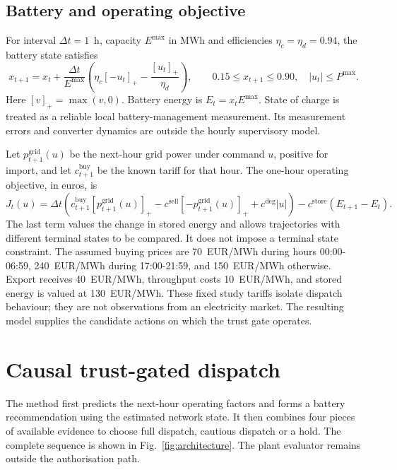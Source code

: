 \documentclass[11pt,a4paper]{article}
\newcommand{\pos}[1]{[#1]_{+}}
\begin{document}
\subsection{Battery and operating objective}
For interval $\Delta t=1$~h, capacity $E^{\max}$ in MWh and efficiencies $\eta_c=\eta_d=0.94$, the battery state satisfies
\begin{equation}
x_{t+1}=x_t+\frac{\Delta t}{E^{\max}}\left(\eta_c\pos{-u_t}-\frac{\pos{u_t}}{\eta_d}\right),\qquad
0.15\leq x_{t+1}\leq0.90,\quad |u_t|\leq P^{\max}.
\label{eq:soc}
\end{equation}
Here $\pos{v}=\max(v,0)$. Battery energy is $E_t=x_tE^{\max}$. State of charge is treated as a reliable local battery-management measurement. Its measurement errors and converter dynamics are outside the hourly supervisory model.

Let $p_{t+1}^{\mathrm{grid}}(u)$ be the next-hour grid power under command $u$, positive for import, and let $c_{t+1}^{\mathrm{buy}}$ be the known tariff for that hour. The one-hour operating objective, in euros, is
\begin{equation}
J_t(u)=\Delta t\left(c_{t+1}^{\mathrm{buy}}\pos{p_{t+1}^{\mathrm{grid}}(u)}
-c^{\mathrm{sell}}\pos{-p_{t+1}^{\mathrm{grid}}(u)}+c^{\mathrm{deg}}|u|\right)
-c^{\mathrm{store}}(E_{t+1}-E_t).
\label{eq:cost}
\end{equation}
The last term values the change in stored energy and allows trajectories with different terminal states to be compared. It does not impose a terminal state constraint. The assumed buying prices are 70~EUR/MWh during hours 00:00-06:59, 240~EUR/MWh during 17:00-21:59, and 150~EUR/MWh otherwise. Export receives 40~EUR/MWh, throughput costs 10~EUR/MWh, and stored energy is valued at 130~EUR/MWh. These fixed study tariffs isolate dispatch behaviour; they are not observations from an electricity market. The resulting model supplies the candidate actions on which the trust gate operates.

\section{Causal trust-gated dispatch}\label{sec:method}
The method first predicts the next-hour operating factors and forms a battery recommendation using the estimated network state. It then combines four pieces of available evidence to choose full dispatch, cautious dispatch or a hold. The complete sequence is shown in Fig.~\ref{fig:architecture}. The plant evaluator remains outside the authorisation path.
\end{document}
